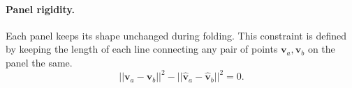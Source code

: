

\paragraph{Panel rigidity.} 
Each panel keeps its shape unchanged during folding. This constraint is defined by keeping the length of each line connecting any pair of points $\mathbf{v}_{a}, \mathbf{v}_{b}$ on the panel the same.
\begin{equation}
||\mathbf{v}_{a} - \mathbf{v}_{b}||^2 - ||\hat{\mathbf{v}}_{a} - \hat{\mathbf{v}}_{b}||^2 = 0.
\label{equ:plane}
\end{equation}




